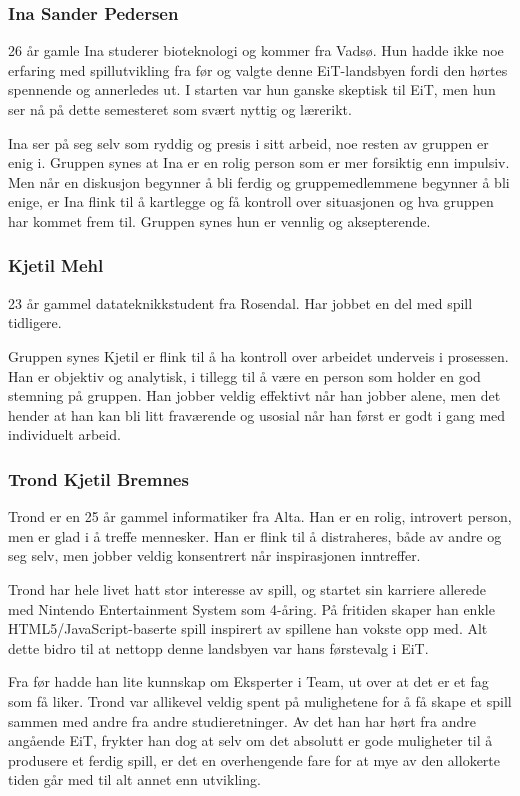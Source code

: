 	\subsubsection{Ina Sander Pedersen}
	26 år gamle Ina studerer bioteknologi og kommer fra Vadsø. Hun hadde ikke noe erfaring med spillutvikling fra før og valgte denne EiT-landsbyen fordi den hørtes spennende og annerledes ut. I starten var hun ganske skeptisk til EiT, men hun ser nå på dette semesteret som svært nyttig og lærerikt.

	Ina ser på seg selv som ryddig og presis i sitt arbeid, noe resten av gruppen er enig i. Gruppen synes at Ina er en rolig person som er mer forsiktig enn impulsiv. Men når en diskusjon begynner å bli ferdig og gruppemedlemmene begynner å bli enige, er Ina flink til å kartlegge og få kontroll over situasjonen og hva gruppen har kommet frem til. Gruppen synes hun er vennlig og aksepterende.

	\subsubsection{Kjetil Mehl}
	23 år gammel datateknikkstudent fra Rosendal. Har jobbet en del med spill tidligere.

	Gruppen synes Kjetil er flink til å ha kontroll over arbeidet underveis i prosessen. Han er objektiv og analytisk, i tillegg til å være en person som holder en god stemning på gruppen. Han jobber veldig effektivt når han jobber alene, men det hender at han kan bli litt fraværende og usosial når han først er godt i gang med individuelt arbeid.


	\subsubsection{Trond Kjetil Bremnes}
	Trond er en 25 år gammel informatiker fra Alta. Han er en rolig, introvert person, men er glad i å treffe mennesker. Han er flink til å distraheres, både av andre og seg selv, men jobber veldig konsentrert når inspirasjonen inntreffer.

	Trond har hele livet hatt stor interesse av spill, og startet sin karriere allerede med Nintendo Entertainment System som 4-åring. På fritiden skaper han enkle HTML5/JavaScript-baserte spill inspirert av spillene han vokste opp med. Alt dette bidro til at nettopp denne landsbyen var hans førstevalg i EiT.

	Fra før hadde han lite kunnskap om Eksperter i Team, ut over at det er et fag som få liker. Trond var allikevel veldig spent på mulighetene for å få skape et spill sammen med andre fra andre studieretninger. Av det han har hørt fra andre angående EiT, frykter han dog at selv om det absolutt er gode muligheter til å produsere et ferdig spill, er det en overhengende fare for at mye av den allokerte tiden går med til alt annet enn utvikling.


